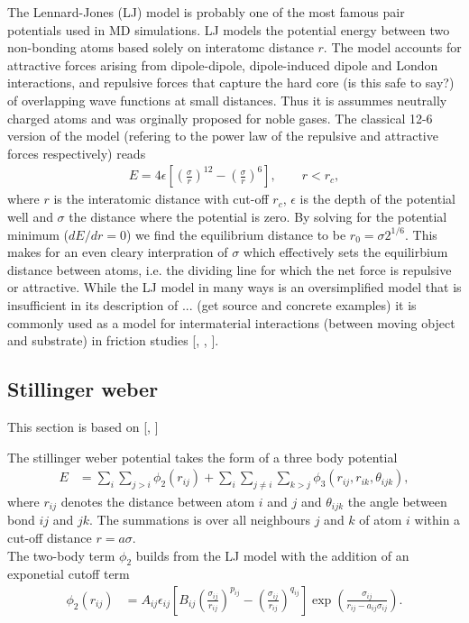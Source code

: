 The Lennard-Jones (LJ) model is probably one of the most famous pair potentials used in MD simulations. LJ models the potential energy between two non-bonding atoms based solely on interatomc distance $r$. The model accounts for attractive forces arising from dipole-dipole, dipole-induced dipole and London interactions, and repulsive forces that capture the hard core (is this safe to say?) of overlapping wave functions at small distances. Thus it is assummes neutrally charged atoms and was orginally proposed for noble gases. The classical 12-6 version of the model (refering to the power law of the repulsive and attractive forces respectively) reads
\begin{align}
  E = 4\epsilon \left[\left(\frac{\sigma}{r}\right)^{12} - \left(\frac{\sigma}{r}\right)^6 \right ], \qquad r < r_c,
  \label{eq:LJ}
\end{align}
where $r$ is the interatomic distance with cut-off $r_c$, $\epsilon$ is the depth of the potential well and $\sigma$ the distance where the potential is zero. By solving for the potential minimum ($dE/dr = 0$) we find the equilibrium distance to be $r_0 = \sigma 2^{1/6}$. This makes for an even cleary interpration of $\sigma$ which effectively sets the equilirbium distance between atoms, i.e. the dividing line for which the net force is repulsive or attractive. While the LJ model in many ways is an oversimplified model that is insufficient in its description of ... (get source and concrete examples) it is commonly used as a model for intermaterial interactions (between moving object and substrate) in friction studies [\cite{li_evolving_2016}, \cite{ZHANG201585}, \cite{kim_nano-scale_2009}].


\subsection{Stillinger weber}
This section is based on [\cite{docs_lammps_sw}, \cite{PhysRevB.31.5262}]

The stillinger weber potential takes the form of a three body potential
\begin{align*}
  E &=\sum_i \sum_{j>i} \phi_2(r_{i j})+\sum_i \sum_{j \neq i} \sum_{k>j} \phi_3(r_{ij}, r_{ik}, \theta_{ijk}),
\end{align*}
where $r_{ij}$ denotes the distance between atom $i$ and $j$ and $\theta_{ijk}$ the angle between bond $ij$ and $jk$. The summations is over all neighbours $j$ and $k$ of atom $i$ within a cut-off distance $r = a\sigma$. \\
The two-body term $\phi_2$ builds from the LJ model with the addition of an exponetial cutoff term
\begin{align}
  \phi_2(r_{i j}) & =A_{ij} \epsilon_{ij}\left[B_{ij}\left(\frac{\sigma_{ij}}{r_{ij}}\right)^{p_{ij}} - \left(\frac{\sigma_{ij}}{r_{ij}}\right)^{q_{ij}}\right] \exp (\frac{\sigma_{ij}}{r_{ij}-a_{ij} \sigma_{ij}}).
  \label{eq:sw_2}
\end{align}

